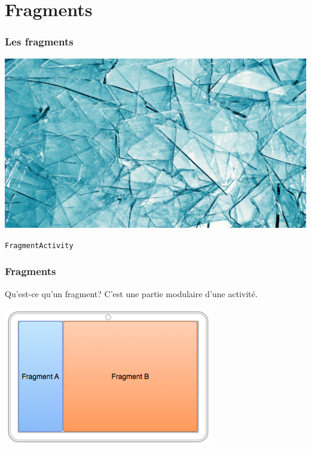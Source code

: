 \documentclass{beamer}
\begin{document}
\section{Fragments}

\begin{frame}
\frametitle{Les fragments}

\begin{center}
\includegraphics[scale=0.165]{fragments_glass.jpg}
\end{center}

\begin{block}{}
\begin{center}
\verb!FragmentActivity!
\end{center}
\end{block}
\end{frame}

\begin{frame}
\frametitle{Fragments}
\begin{block}{Qu'est-ce qu'un fragment?}
C'est une partie modulaire d'une activité.
\end{block}

\begin{center}
\includegraphics[scale=0.5]{fragments-screen-tab.png}
\end{center}
\end{frame}
\end{document}
